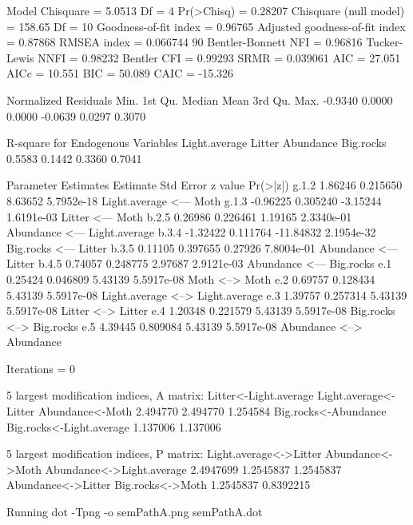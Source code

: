 \documentclass[12pt]{article}
\begin{document}
\begin{Schunk}
\begin{Soutput}
 Model Chisquare =  5.0513   Df =  4 Pr(>Chisq) = 0.28207
 Chisquare (null model) =  158.65   Df =  10
 Goodness-of-fit index =  0.96765
 Adjusted goodness-of-fit index =  0.87868
 RMSEA index =  0.066744   90%
 Bentler-Bonnett NFI =  0.96816
 Tucker-Lewis NNFI =  0.98232
 Bentler CFI =  0.99293
 SRMR =  0.039061
 AIC =  27.051
 AICc =  10.551
 BIC =  50.089
 CAIC =  -15.326

 Normalized Residuals
   Min. 1st Qu.  Median    Mean 3rd Qu.    Max. 
-0.9340  0.0000  0.0000 -0.0639  0.0297  0.3070 

 R-square for Endogenous Variables
Light.average        Litter     Abundance     Big.rocks 
       0.5583        0.1442        0.3360        0.7041 

 Parameter Estimates
      Estimate Std Error z value   Pr(>|z|)                                   
g.1.2  1.86246 0.215650    8.63652 5.7952e-18 Light.average <--- Moth         
g.1.3 -0.96225 0.305240   -3.15244 1.6191e-03 Litter <--- Moth                
b.2.5  0.26986 0.226461    1.19165 2.3340e-01 Abundance <--- Light.average    
b.3.4 -1.32422 0.111764  -11.84832 2.1954e-32 Big.rocks <--- Litter           
b.3.5  0.11105 0.397655    0.27926 7.8004e-01 Abundance <--- Litter           
b.4.5  0.74057 0.248775    2.97687 2.9121e-03 Abundance <--- Big.rocks        
e.1    0.25424 0.046809    5.43139 5.5917e-08 Moth <--> Moth                  
e.2    0.69757 0.128434    5.43139 5.5917e-08 Light.average <--> Light.average
e.3    1.39757 0.257314    5.43139 5.5917e-08 Litter <--> Litter              
e.4    1.20348 0.221579    5.43139 5.5917e-08 Big.rocks <--> Big.rocks        
e.5    4.39445 0.809084    5.43139 5.5917e-08 Abundance <--> Abundance        

 Iterations =  0 
\end{Soutput}
\begin{Soutput}
 5 largest modification indices, A matrix:
   Litter<-Light.average    Light.average<-Litter          Abundance<-Moth 
                2.494770                 2.494770                 1.254584 
    Big.rocks<-Abundance Big.rocks<-Light.average 
                1.137006                 1.137006 

  5 largest modification indices, P matrix:
   Light.average<->Litter          Abundance<->Moth Abundance<->Light.average 
                2.4947699                 1.2545837                 1.2545837 
       Abundance<->Litter          Big.rocks<->Moth 
                1.2545837                 0.8392215 
\end{Soutput}
\begin{Soutput}
Running  dot -Tpng -o semPathA.png  semPathA.dot 
\end{Soutput}
\end{Schunk}
\end{document}
